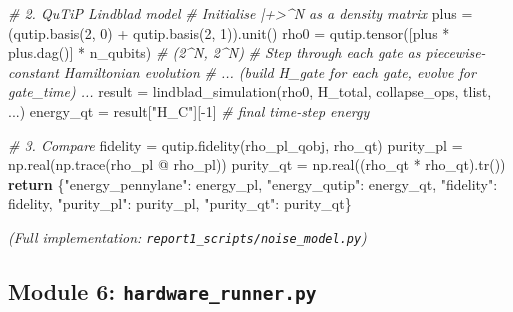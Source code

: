 \documentclass[
  11pt,
]{report}
\newenvironment{Shaded}{}{}
\newcommand{\CommentTok}[1]{\textcolor[rgb]{0.38,0.63,0.69}{\textit{#1}}}
\newcommand{\ControlFlowTok}[1]{\textcolor[rgb]{0.00,0.44,0.13}{\textbf{#1}}}
\newcommand{\DecValTok}[1]{\textcolor[rgb]{0.25,0.63,0.44}{#1}}
\newcommand{\NormalTok}[1]{#1}
\newcommand{\OperatorTok}[1]{\textcolor[rgb]{0.40,0.40,0.40}{#1}}
\newcommand{\StringTok}[1]{\textcolor[rgb]{0.25,0.44,0.63}{#1}}
\begin{document}
\begin{Shaded}
\begin{Highlighting}[]
    \CommentTok{\# 2. QuTiP Lindblad model}
    \CommentTok{\# Initialise |+\textgreater{}\^{}N as a density matrix}
\NormalTok{    plus }\OperatorTok{=}\NormalTok{ (qutip.basis(}\DecValTok{2}\NormalTok{, }\DecValTok{0}\NormalTok{) }\OperatorTok{+}\NormalTok{ qutip.basis(}\DecValTok{2}\NormalTok{, }\DecValTok{1}\NormalTok{)).unit()}
\NormalTok{    rho0 }\OperatorTok{=}\NormalTok{ qutip.tensor([plus }\OperatorTok{*}\NormalTok{ plus.dag()] }\OperatorTok{*}\NormalTok{ n\_qubits)    }\CommentTok{\# (2\^{}N, 2\^{}N)}
    \CommentTok{\# Step through each gate as piecewise{-}constant Hamiltonian evolution}
    \CommentTok{\# ... (build H\_gate for each gate, evolve for gate\_time) ...}
\NormalTok{    result }\OperatorTok{=}\NormalTok{ lindblad\_simulation(rho0, H\_total, collapse\_ops, tlist, ...)}
\NormalTok{    energy\_qt }\OperatorTok{=}\NormalTok{ result[}\StringTok{"H\_C"}\NormalTok{][}\OperatorTok{{-}}\DecValTok{1}\NormalTok{]        }\CommentTok{\# final time{-}step energy}

    \CommentTok{\# 3. Compare}
\NormalTok{    fidelity }\OperatorTok{=}\NormalTok{ qutip.fidelity(rho\_pl\_qobj, rho\_qt)}
\NormalTok{    purity\_pl }\OperatorTok{=}\NormalTok{ np.real(np.trace(rho\_pl }\OperatorTok{@}\NormalTok{ rho\_pl))}
\NormalTok{    purity\_qt }\OperatorTok{=}\NormalTok{ np.real((rho\_qt }\OperatorTok{*}\NormalTok{ rho\_qt).tr())}
    \ControlFlowTok{return}\NormalTok{ \{}\StringTok{"energy\_pennylane"}\NormalTok{: energy\_pl, }\StringTok{"energy\_qutip"}\NormalTok{: energy\_qt,}
            \StringTok{"fidelity"}\NormalTok{: fidelity, }\StringTok{"purity\_pl"}\NormalTok{: purity\_pl, }\StringTok{"purity\_qt"}\NormalTok{: purity\_qt\}}
\end{Highlighting}
\end{Shaded}

\emph{(Full implementation: \texttt{report1\_scripts/noise\_model.py})}

\subsection{\texorpdfstring{Module 6:
\texttt{hardware\_runner.py}}{Module 6: hardware\_runner.py}}\label{module-6-hardware_runner.py}
\end{document}
